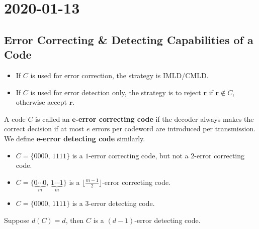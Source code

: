 \section{2020-01-13}
\subsection{Error Correcting \& Detecting Capabilities of a Code}
\begin{itemize}
    \item If $ C $ is used for error correction, the strategy is IMLD/CMLD.
    \item If $ C $ is used for error detection only, the strategy is
    to reject $ \bm{r} $ if $ \bm{r}\notin C $, otherwise accept $ \bm{r} $.
\end{itemize}
\begin{defbox}
    \begin{definition}
    A code $ C $ is called an \textbf{$\bm{e}$-error correcting code}
    if the decoder always makes the correct decision if
    at most $ e $ errors per codeword are introduced per transmission.
    We define \textbf{$\bm{e}$-error detecting code} similarly.
\end{definition} \end{defbox}

\begin{exbox}
\begin{example}

    \begin{itemize}
        \item $ C=\{0000,\,1111\} $ is a $ 1 $-error correcting code, but not a
        $ 2 $-error correcting code.
        \item $ C=\{\underbrace{0\cdots 0}_{m},\,\underbrace{1\cdots 1}_{m}\} $
        is a $ \lfloor \frac{m-1}{2} \rfloor $-error correcting code.
        \item $ C=\{0000,\,1111\} $ is a $ 3 $-error detecting code.
    \end{itemize}
\end{example}
\end{exbox}

\begin{thmbox}
    \begin{theorem}
    Suppose $ d(C)=d $, then $ C $ is a $ (d-1) $-error detecting code.
\end{theorem} \end{thmbox}

